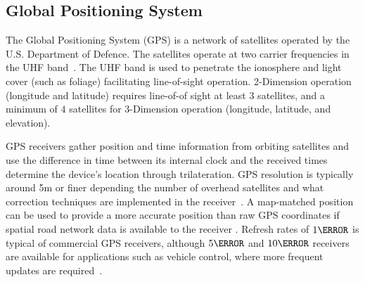 \documentclass[numbered]{trbunofficial}
\begin{document}
\subsection{Global Positioning System}\label{sec:gps}
The Global Positioning System (GPS) is a network of satellites operated by the U.S. Department of Defence. The satellites operate at two carrier frequencies %
in the UHF band~\cite{hofmann2012}. The UHF band is used to penetrate the ionosphere and light cover (such as foliage) facilitating line-of-sight operation. 2-Dimension operation (longitude and latitude) requires line-of-of sight at least $3$ satellites, and a minimum of $4$ satellites for 3-Dimension operation (longitude, latitude, and elevation). %

GPS receivers gather position and time information from orbiting satellites and use the difference in time between its internal clock and the received times determine the device's location through trilateration. GPS resolution is typically around 5m or finer depending the number of overhead satellites and what correction techniques are implemented in the receiver~\cite{grewal01}. A map-matched position can be used to provide a more accurate position than raw GPS coordinates if spatial road network data is available to the receiver \cite{Quddus2007}. Refresh rates of $1\Hz$ is typical of commercial GPS receivers, although $5\Hz$ and $10\Hz$ receivers are available for applications such as vehicle control, where more frequent updates are required~\cite{bae2001}.
\end{document}
